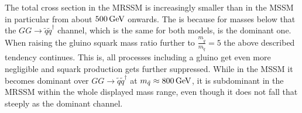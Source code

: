 The total cross section in the MRSSM is increasingly smaller than in the MSSM in particular from about $\unit[500]{GeV}$ onwards. The is because for masses below that the $GG \to \tilde{q}\tilde{q}^\dagger$ channel, which is the same for both models, is the dominant one.\\
When raising the gluino squark mass ratio further to $\frac{m_{\tilde{g}}}{m_{\tilde{q}}} = 5$ the above described tendency continues. This is, all processes including a gluino get even more negligible and squark production gets further suppressed. While in the MSSM it becomes dominant over $GG \to \tilde{q}\tilde{q}^\dagger$ at $m_{\tilde{q}} \approx \unit[800]{GeV}$, it is subdominant in the MRSSM within the whole displayed mass range, even though it does not fall that steeply as the dominant channel.\\

